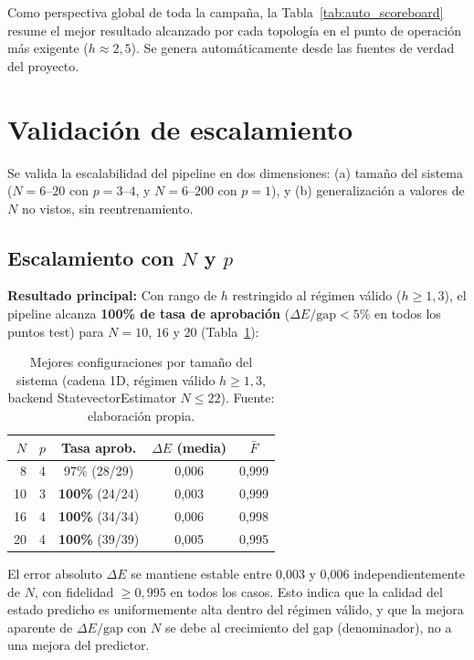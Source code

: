 \documentclass[11pt,a4paper,spanish]{book}
\begin{document}
Como perspectiva global de toda la campaña, la Tabla~\ref{tab:auto_scoreboard} resume el mejor resultado alcanzado por cada topología en el punto de operación más exigente ($h \approx 2,5$). Se genera automáticamente desde las fuentes de verdad del proyecto.



\section{Validación de escalamiento}

Se valida la escalabilidad del pipeline en dos dimensiones: (a) tamaño del sistema ($N = 6$--$20$ con $p = 3$--$4$, y $N = 6$--$200$ con $p = 1$), y (b) generalización a valores de $N$ no vistos, sin reentrenamiento.

\subsection{Escalamiento con $N$ y $p$}
\label{subsec:scaling_np}

\textbf{Resultado principal:} Con rango de $h$ restringido al régimen válido ($h \geq 1,3$), el pipeline alcanza \textbf{100\% de tasa de aprobación} ($\Delta E/\text{gap} < 5\%$ en todos los puntos test) para $N = 10$, $16$ y $20$ (Tabla~\ref{tab:scaling}):

\begin{table}[h]
\centering
\caption[Mejores configuraciones por tamaño del sistema (cadena 1D)]{Mejores configuraciones por tamaño del sistema (cadena 1D, régimen válido $h \geq 1,3$, backend StatevectorEstimator $N \leq 22$). Fuente: elaboración propia.}
\label{tab:scaling}
\begin{tabular}{rcccc}
\toprule
\textbf{$N$} & \textbf{$p$} & \textbf{Tasa aprob.} & \textbf{$\Delta E$ (media)} & \textbf{$\bar{F}$} \\
\midrule
8 & 4 & 97\% (28/29) & 0,006 & 0,999 \\
10 & 3 & \textbf{100\%} (24/24) & 0,003 & 0,999 \\
16 & 4 & \textbf{100\%} (34/34) & 0,006 & 0,998 \\
20 & 4 & \textbf{100\%} (39/39) & 0,005 & 0,995 \\
\bottomrule
\end{tabular}
\end{table}

El error absoluto $\Delta E$ se mantiene estable entre 0,003 y 0,006 independientemente de $N$, con fidelidad $\geq 0,995$ en todos los casos. Esto indica que la calidad del estado predicho es uniformemente alta dentro del régimen válido, y que la mejora aparente de $\Delta E/\text{gap}$ con $N$ se debe al crecimiento del gap (denominador), no a una mejora del predictor.
\end{document}
